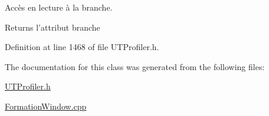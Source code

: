 Accès en lecture à la branche. 

\begin{DoxyReturn}{Returns}
l'attribut branche 
\end{DoxyReturn}


Definition at line 1468 of file U\-T\-Profiler.\-h.



The documentation for this class was generated from the following files\-:\begin{DoxyCompactItemize}
\item 
\hyperlink{_u_t_profiler_8h}{U\-T\-Profiler.\-h}\item 
\hyperlink{_formation_window_8cpp}{Formation\-Window.\-cpp}\end{DoxyCompactItemize}

